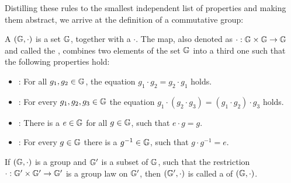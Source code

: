 Distilling these rules to the smallest independent list of properties and making them abstract, we arrive at the definition of a commutative group:

\begin{definition}
A  $(\mathbb{G},\cdot) $ is a set $ \mathbb{G}$, together with a  $ \cdot$. The map, also denoted as $\cdot:\mathbb{G} \times \mathbb{G} \to \mathbb{G} $ and called the , combines two elements of the set $ \mathbb{G}$ into a third one such that the following properties hold:
\begin{itemize}
\item {}: For all $g_1,g_2\in\mathbb{G}$, the equation $g_1\cdot g_2=g_2\cdot g_1$ holds.
\item {}: For every $g_1,g_2,g_3\in\mathbb{G}$ the equation
$g_1\cdot(g_2\cdot g_3) = (g_1\cdot g_2)\cdot g_3$ holds.
\item {}: There is a $e\in\mathbb{G}$ for all $g\in\mathbb{G}$, such that $e\cdot g=g$.
\item {}: For every $g\in\mathbb{G}$ there is a $g^{-1}\in\mathbb{G}$, such that $g\cdot g^{-1}=e$.
\end{itemize}
If $(\mathbb{G},\cdot)$ is a group and $\mathbb{G}'$ is a subset of $\mathbb{G}$, such that the restriction $\cdot: \mathbb{G}'\times \mathbb{G}' \to \mathbb{G}'$ is a group law on $\mathbb{G}'$, then $(\mathbb{G}',\cdot)$ is called a  of $(\mathbb{G},\cdot)$.
\end{definition}

